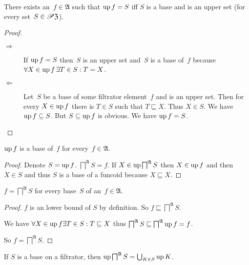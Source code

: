 \begin{prop}
There exists an~$f\in\mathfrak{A}$ such that $\operatorname{up} f=S$ iff $S$ is a base and is an upper set
(for every set~$S\in\mathscr{P}\mathfrak{Z}$).
\end{prop}

\begin{proof}
~
\begin{description}
\item[$\Rightarrow$] If $\operatorname{up} f=S$ then~$S$ is an upper set and~$S$ is a base of~$f$ because
  $\forall X\in\operatorname{up} f\,\exists T\in S:T=X$.

\item[$\Leftarrow$] Let~$S$ be a base of some filtrator element~$f$ and is an upper set.
Then for every $X\in\operatorname{up} f$ there is $T\in S$ such that $T\sqsubseteq X$.
Thus $X\in S$. We have $\operatorname{up} f\subseteq S$. But $S\subseteq\operatorname{up} f$ is obvious.
We have $\operatorname{up} f=S$.
\end{description}
\end{proof}


\begin{prop}
$\operatorname{up} f$ is a base of~$f$ for every~$f\in\mathfrak{A}$.
\end{prop}

\begin{proof}
Denote $S=\operatorname{up} f$.
$\bigsqcap^{\mathfrak{A}} S = f$.
If $X \in \operatorname{up} \bigsqcap^{\mathfrak{A}} S$ then $X \in \operatorname{up}
f$ and then $X \in S$ and thus $S$ is a base of a funcoid because $X
\sqsubseteq X$.
\end{proof}

\begin{prop}
$f = \bigsqcap^{\mathfrak{A}} S$ for every base~$S$ of an~$f\in\mathfrak{A}$.
\end{prop}

\begin{proof}
$f$ is an lower bound of $S$ by definition. So $f \sqsubseteq
\bigsqcap^{\mathfrak{A}} S$.

We have $\forall X \in \operatorname{up} f \exists T \in S : T \sqsubseteq X$ thus
$\bigsqcap^{\mathfrak{A}} S \sqsubseteq \bigsqcap^{\mathfrak{A}}
\operatorname{up} f = f$.

So $f = \bigsqcap^{\mathfrak{A}} S$.
\end{proof}

\begin{prop}
If $S$ is a base on a filtrator, then
$\operatorname{up} \bigsqcap^{\mathfrak{A}} S = \bigcup_{K\in S}\operatorname{up} K$.
\end{prop}

